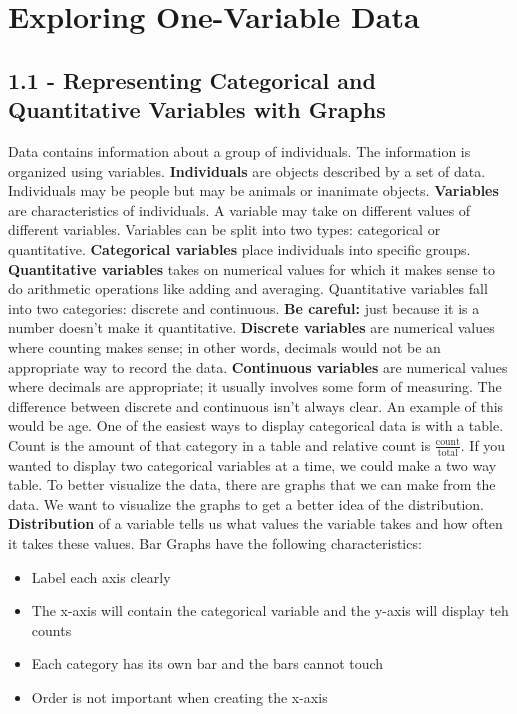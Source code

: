 \documentclass[../stats.tex]{subfiles}
\begin{document}
\chapter{Exploring One-Variable Data}
\section*{1.1 - Representing Categorical and Quantitative Variables with Graphs}
Data contains information about a group of individuals. The information is organized using variables.
\smallbreak
\textbf{Individuals} are objects described by a set of data. Individuals may be people but may be animals or inanimate objects.
\smallbreak
\textbf{Variables} are characteristics of individuals. A variable may take on different values of different variables. Variables can be split into two types: categorical or quantitative.
\smallbreak
\textbf{Categorical variables} place individuals into specific groups.
\smallbreak
\textbf{Quantitative variables} takes on numerical values for which it makes sense to do arithmetic operations like adding and averaging. Quantitative variables fall into two categories: discrete and continuous.
\smallbreak
\textbf{Be careful: } just because it is a number doesn't make it quantitative.
\smallbreak
\textbf{Discrete variables} are numerical values where counting makes sense; in other words, decimals would not be an appropriate way to record the data.
\smallbreak
\textbf{Continuous variables} are numerical values where decimals are appropriate; it usually involves some form of measuring.
\smallbreak
The difference between discrete and continuous isn't always clear. An example of this would be age.
\medbreak
One of the easiest ways to display categorical data is with a table.
\smallbreak
Count is the amount of that category in a table and relative count is $\frac{\text{count}}{\text{total}}$.
\smallbreak
If you wanted to display two categorical variables at a time, we could make a two way table.
\smallbreak
To better visualize the data, there are graphs that we can make from the data. We want to visualize the graphs to get a better idea of the distribution.
\smallbreak
\textbf{Distribution} of a variable tells us what values the variable takes and how often it takes these values.
\smallbreak
Bar Graphs have the following characteristics:
\begin{itemize}
    \item Label each axis clearly
    \item The x-axis will contain the categorical variable and the y-axis will display teh counts
    \item Each category has its own bar and the bars cannot touch
    \item Order is not important when creating the x-axis
\end{itemize}
\end{document}
